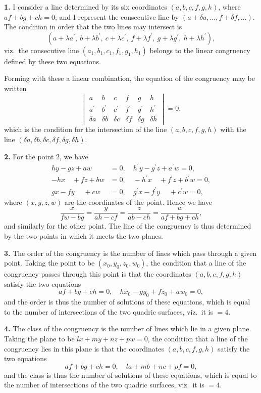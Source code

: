 \documentclass[11pt,a4paper]{book}
\begin{document}
{{{\textbf{1.} I consider a line determined by its six coordinates $(a, b, c, f, g, h)$, where
$af + bg + ch = 0$; and I represent the consecutive line by $(a + \delta a, \ldots, f + \delta f, \ldots)$.
The condition in order that the two lines may intersect is
\[
(a + \lambda a^\prime,\ b + \lambda b^\prime,\ c + \lambda c^\prime,\ f + \lambda f^\prime,\ g + \lambda g^\prime,\ h + \lambda h^\prime),
\]
viz.~the consecutive line $(a_1, b_1, c_1, f_1, g_1, h_1)$ belongs to the linear congruency defined
by these two equations.

Forming with these a linear combination, the equation of the congruency may
be written
\[
\begin{vmatrix}
a & b & c & f & g & h \\
a^\prime & b^\prime & c^\prime & f^\prime & g^\prime & h^\prime \\
\delta a & \delta b & \delta c & \delta f & \delta g & \delta h
\end{vmatrix} = 0,
\]
which is the condition for the intersection of the line $(a, b, c, f, g, h)$ with the line
$(\delta a, \delta b, \delta c, \delta f, \delta g, \delta h)$.

\textbf{2.} For the point $2$, we have
\begin{align*}
hy - gz + aw &= 0, \quad h^\prime y - g^\prime z + a^\prime w = 0,\\
-hx\quad + fz + bw &= 0, \quad -h^\prime x\quad + f^\prime z + b^\prime w = 0,\\
gx - fy\quad\; + cw &= 0, \quad g^\prime x - f^\prime y\quad\; + c^\prime w = 0,
\end{align*}
where $(x, y, z, w)$ are the coordinates of the point. Hence we have
\[
\frac{x}{fw - bg} = \frac{y}{ah - cf} = \frac{z}{ab - ch} = \frac{w}{af + bg + ch},
\]
and similarly for the other point. The line of the congruency is thus determined
by the two points in which it meets the two planes.

\textbf{3.} The order of the congruency is the number of lines which pass through
a given point. Taking the point to be $(x_0, y_0, z_0, w_0)$, the condition that a line of the
congruency passes through this point is that the coordinates $(a, b, c, f, g, h)$ satisfy
the two equations
\[
af + bg + ch = 0, \quad hx_0 - gy_0 + fz_0 + aw_0 = 0,
\]
and the order is thus the number of solutions of these equations, which is equal
to the number of intersections of the two quadric surfaces, viz.~it is $= 4$.

\textbf{4.} The class of the congruency is the number of lines which lie in a given
plane. Taking the plane to be $lx + my + nz + pw = 0$, the condition that a line
of the congruency lies in this plane is that the coordinates $(a, b, c, f, g, h)$ satisfy
the two equations
\[
af + bg + ch = 0, \quad la + mb + nc + pf = 0,
\]
and the class is thus the number of solutions of these equations, which is equal
to the number of intersections of the two quadric surfaces, viz.~it is $= 4$.

}}}
\end{document}
